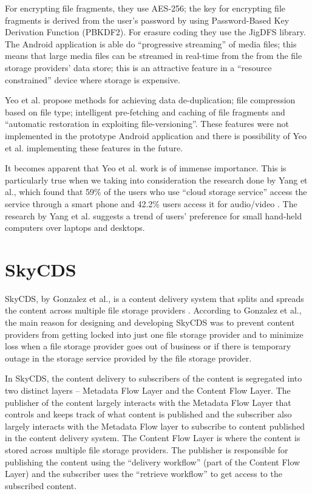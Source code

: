 For encrypting file fragments, they use AES-256; the key for
encrypting file fragments is derived from the user's password by using
Password-Based Key Derivation Function (PBKDF2)\cite{kaliski}. For
erasure coding they use the JigDFS library\cite{jigdfs}. The Android
application is able do ``progressive streaming'' of media files; this
means that large media files can be streamed in real-time from the
from the file storage providers' data store; this is an attractive
feature in a ``resource constrained'' device where storage is
expensive.

Yeo et al. propose methods for achieving data de-duplication; file
compression based on file type; intelligent pre-fetching and caching
of file fragments and ``automatic restoration in exploiting
file-versioning''. These features were not implemented in the
prototype Android application and there is possibility of Yeo et
al. implementing these features in the future.

It becomes apparent that Yeo et al. work is of immense
importance. This is particularly true when we taking into
consideration the research done by Yang et al., which found that 59\%
of the users who use ``cloud storage service'' access the service
through a smart phone and 42.2\% users access it for audio/video
\cite{yang}. The research by Yang et al. suggests a trend of users'
preference for small hand-held computers over laptops and desktops.

\section{SkyCDS}\label{2-skycds-sec}

SkyCDS, by Gonzalez et al., is a content delivery system that splits
and spreads the content across multiple file storage providers
\cite{skycds}. According to Gonzalez et al., the main reason for
designing and developing SkyCDS was to prevent content providers from
getting locked into just one file storage provider and to minimize
loss when a file storage provider goes out of business or if there is
temporary outage in the storage service provided by the file storage
provider.

In SkyCDS, the content delivery to subscribers of the content is
segregated into two distinct layers -- Metadata Flow Layer and the
Content Flow Layer. The publisher of the content largely interacts
with the Metadata Flow Layer that controls and keeps track of what
content is published and the subscriber also largely interacts with
the Metadata Flow layer to subscribe to content published in the
content delivery system. The Content Flow Layer is where the content
is stored across multiple file storage providers. The publisher is
responsible for publishing the content using the ``delivery workflow''
(part of the Content Flow Layer) and the subscriber uses the
``retrieve workflow'' to get access to the subscribed content.

